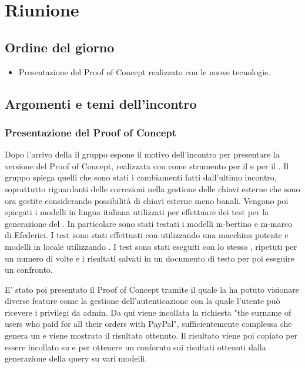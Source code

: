 \section{Riunione}
\subsection{Ordine del giorno}
\begin{itemize}
	\item Presentazione del Proof of Concept realizzato con le nuove tecnologie.
\end{itemize}

\subsection{Argomenti e temi dell'incontro}

\subsubsection{Presentazione del Proof of Concept}

\par Dopo l'arrivo della  il gruppo espone il motivo dell'incontro per presentare la versione del Proof of Concept, realizzata con  come strumento per il  e  per il .
Il gruppo spiega quelli che sono stati i cambiamenti fatti dall'ultimo incontro, soprattutto riguardanti delle correzioni nella gestione delle chiavi esterne che sono ora gestite considerando possibilità di chiavi esterne meno banali.
Vengono poi spiegati i modelli in lingua italiana utilizzati per effettuare dei test per la generazione del . In particolare sono stati testati i modelli m-bertino e m-marco di Efederici. I test sono stati effettuati con  utilizzando una macchina potente e modelli in locale utilizzando . 
I test sono stati eseguiti con lo stesso , ripetuti per un numero di volte e i risultati salvati in un documento di testo per poi eseguire un confronto.

\par E' stato poi presentato il Proof of Concept tramite il quale la  ha potuto visionare diverse feature come la gestione dell'autenticazione con la quale l'utente può ricevere i privilegi da admin. 
Da qui viene incollata la richiesta "the surname of users who paid for all their orders with PayPal", sufficientemente complessa che genera un  e viene mostrato il risultato ottenuto.
Il risultato viene poi copiato per essere incollato su  e  per ottenere un confornto sui risultati ottenuti dalla generazione della query su vari modelli.

